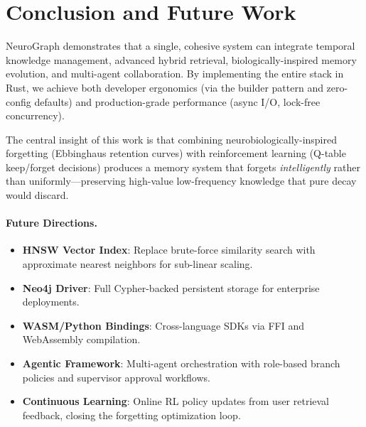\documentclass[11pt,a4paper,twocolumn]{article}
\begin{document}
\section{Conclusion and Future Work}
\label{sec:conclusion}

NeuroGraph demonstrates that a single, cohesive system can integrate
temporal knowledge management, advanced hybrid retrieval,
biologically-inspired memory evolution, and multi-agent collaboration.
By implementing the entire stack in Rust, we achieve both developer
ergonomics (via the builder pattern and zero-config defaults) and
production-grade performance (async I/O, lock-free concurrency).

The central insight of this work is that combining
neurobiologically-inspired forgetting (Ebbinghaus retention curves)
with reinforcement learning (Q-table keep/forget decisions) produces
a memory system that forgets \emph{intelligently} rather than
uniformly---preserving high-value low-frequency knowledge that pure
decay would discard.

\paragraph{Future Directions.}
\begin{itemize}[leftmargin=*]
  \item \textbf{HNSW Vector Index}: Replace brute-force similarity
    search with approximate nearest neighbors for sub-linear scaling.
  \item \textbf{Neo4j Driver}: Full Cypher-backed persistent storage
    for enterprise deployments.
  \item \textbf{WASM/Python Bindings}: Cross-language SDKs via FFI
    and WebAssembly compilation.
  \item \textbf{Agentic Framework}: Multi-agent orchestration with
    role-based branch policies and supervisor approval workflows.
  \item \textbf{Continuous Learning}: Online RL policy updates from
    user retrieval feedback, closing the forgetting optimization loop.
\end{itemize}
\end{document}

